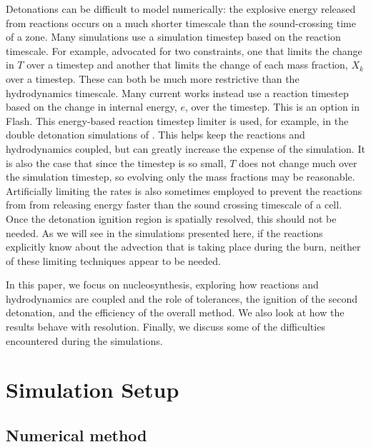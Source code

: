 \documentclass[preprint,linenumbers]{aastex631}
\newcommand{\flash}{{\sf Flash}}
\begin{document}
Detonations can be difficult to model numerically:
the explosive energy released from reactions occurs
on a much shorter timescale than
the sound-crossing time of a zone.  Many
simulations use a simulation timestep based on the reaction
timescale.  For example, \citet{prometheus} advocated for two constraints, one that limits the change in $T$ over a timestep and another that limits the change of each mass fraction, $X_k$ over a timestep.  These can both be much more
restrictive than the hydrodynamics timescale.  Many current works instead use a reaction timestep based on the change in internal energy, $e$, over the timestep. 
 This is an option in \flash.  This energy-based reaction timestep limiter
 is used, for example, in the double detonation simulations of \citet{kushnirkatz:2020,rivas:2022}.  This helps keep the reactions
and hydrodynamics coupled, but can greatly increase the expense of the
simulation.  It is also the case that since the timestep is so small, $T$ does not change much over the simulation timestep, so evolving only the mass fractions may be reasonable.  
Artificially limiting the
rates \citep{kushnir:2013, shen:2018, kushnirkatz:2020, boos:2021} is also sometimes employed to prevent the reactions from from releasing energy faster than the sound crossing timescale of a cell.  Once the detonation ignition region is spatially resolved, this should not be needed.  As we will see in the simulations presented here, if the reactions explicitly know about the advection that is taking place during the burn, neither of these limiting techniques appear to be needed. 

In this paper, we focus on nucleosynthesis, exploring how reactions and hydrodynamics are coupled and the role of tolerances, the ignition of the second detonation,  and the
efficiency of the overall method.  We also look at how the results behave with resolution.  Finally, we discuss some of the difficulties encountered during the simulations.

\section{Simulation Setup}\label{Sec:setup}

\subsection{Numerical method}
\end{document}
